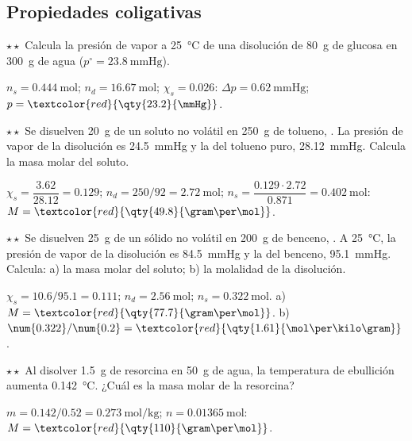 \subsection{Propiedades coligativas}

\begin{exercise}
    \(\star\star\) Calcula la presión de vapor a \qty{25}{\degreeCelsius} de una disolución de \qty{80}{\gram} de glucosa en
    \qty{300}{\gram} de agua (\(p^{\circ} = \qty{23.8}{\mmHg}\)).
    \begin{solu}
        \(n_s = \qty{0.444}{\mol}\); \(n_d = \qty{16.67}{\mol}\); \(\chi_s = \num{0.026}\): \(\Delta p = \qty{0.62}{\mmHg}\);
        \(p = \textcolor{red}{\qty{23.2}{\mmHg}}\).
    \end{solu}
\end{exercise}

\begin{exercise}
    \(\star\star\) Se disuelven \qty{20}{\gram} de un soluto no volátil en \qty{250}{\gram} de tolueno, . La presión de
    vapor de la disolución es \qty{24.5}{\mmHg} y la del tolueno puro, \qty{28.12}{\mmHg}. Calcula la masa molar del soluto.
    \begin{solu}
        \(\chi_s = \dfrac{\num{3.62}}{\num{28.12}} = \num{0.129}\); \(n_d = 250/92 = \qty{2.72}{\mol}\);
        \(n_s = \dfrac{\num{0.129} \cdot \num{2.72}}{\num{0.871}} = \qty{0.402}{\mol}\): \(M = \textcolor{red}{\qty{49.8}{\gram\per\mol}}\).
    \end{solu}
\end{exercise}

\begin{exercise}
    \(\star\star\) Se disuelven \qty{25}{\gram} de un sólido no volátil en \qty{200}{\gram} de benceno, . A
    \qty{25}{\degreeCelsius}, la presión de vapor de la disolución es \qty{84.5}{\mmHg} y la del benceno, \qty{95.1}{\mmHg}.
    Calcula: a) la masa molar del soluto; b) la molalidad de la disolución.
    \begin{solu}
        \(\chi_s = \num{10.6}/\num{95.1} = \num{0.111}\); \(n_d = \qty{2.56}{\mol}\); \(n_s = \qty{0.322}{\mol}\).
        a) \(M = \textcolor{red}{\qty{77.7}{\gram\per\mol}}\). b) \(\num{0.322}/\num{0.2} = \textcolor{red}{\qty{1.61}{\mol\per\kilo\gram}}\).
    \end{solu}
\end{exercise}

\begin{exercise}
    \(\star\star\) Al disolver \qty{1.5}{\gram} de resorcina en \qty{50}{\gram} de agua, la temperatura de ebullición aumenta
    \qty{0.142}{\degreeCelsius}. ¿Cuál es la masa molar de la resorcina?
    \begin{solu}
        \(m = \num{0.142}/\num{0.52} = \qty{0.273}{\mol\per\kilo\gram}\); \(n = \qty{0.01365}{\mol}\): \(M = \textcolor{red}{\qty{110}{\gram\per\mol}}\).
    \end{solu}
\end{exercise}


